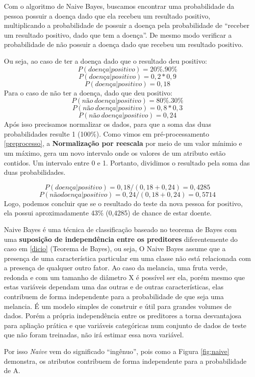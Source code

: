 \documentclass[
]{book}
\begin{document}
Com o algoritmo de Naive Bayes, buscamos encontrar uma probabilidade da pessoa possuir a doença dado que ela recebeu um resultado positivo, multiplicando a probabilidade de possuir a doença pela probabilidade de ``receber um resultado positivo, dado que tem a doença''. De mesmo modo verificar a probabilidade de não possuir a doença dado que recebeu um resultado positivo.

Ou seja, ao caso de ter a doença dado que o resultado deu positivo:
\[P(doença|positivo) = 20\% . 90\% \] \[P(doença|positivo) = 0,2 * 0,9 \] \[P(doença|positivo) = 0,18\]
Para o caso de não ter a doença, dado que deu positivo:
\[P(não \ doença|positivo) = 80\%.30\%\]
\[P(não \ doença|positivo) = 0,8 * 0,3\]
\[P(não\ doença|positivo) = 0,24\]
Após isso precisamos normalizar os dados, para que a soma das duas probabilidades resulte 1 (100\%). Como vimos em pré-processamento \ref{preprocesso}, a \textbf{Normalização por reescala} por meio de um valor mínimio e um máximo, gera um novo intervalo onde os valores de um atributo estão contidos. Um intervalo entre 0 e 1. Portanto, dividimos o resultado pela soma das duas probabilidades.

\[P(doença|positivo) = 0,18/(0,18+0,24) = 0,4285\]
\[P(não doença|positivo) = 0,24/(0,18+0,24) = 0,5714\]
Logo, podemos concluir que se o resultado do teste da nova pessoa for positivo, ela possui aproximadamente 43\% (0,4285) de chance de estar doente.

Naive Bayes é uma técnica de classificação baseado no teorema de Bayes com uma \textbf{suposição de independência entre os preditores} diferentemente do caso em \ref{dicio} (Teorema de Bayes), ou seja, O Naive Bayes assume que a presença de uma característica particular em uma classe não está relacionada com a presença de qualquer outro fator. Ao caso da melancia, uma fruta verde, redonda e com um tamanho de diâmetro X é possível ser ela, porém mesmo que estas variáveis dependam uma das outras e de outras características, elas contribuem de forma independente para a probabilidade de que seja uma melancia. É um modelo simples de construir e útil para grandes volumes de dados. Porém a própria independência entre os preditores a torna desvantajosa para apliação prática e que variáveis categóricas num conjunto de dados de teste que não foram treinadas, não irá estimar essa nova variável.

Por isso \emph{Naive} vem do significado ``ingênuo'', pois como a Figura \ref{fig:naive} demonstra, os atributos contribuem de forma independente para a probabilidade de A.
\end{document}

